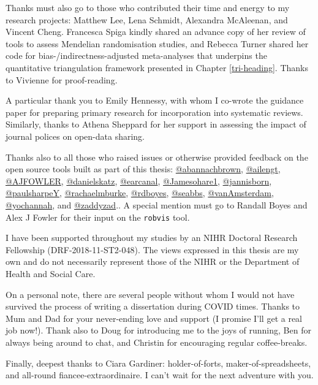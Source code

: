 \documentclass[a4paper, twoside]{templates/ociamthesis}
\begin{document}
\begin{romanpages}
\begin{acknowledgements}
  Thanks must also go to those who contributed their time and energy to my research projects: Matthew Lee, Lena Schmidt, Alexandra McAleenan, and Vincent Cheng. Francesca Spiga kindly shared an advance copy of her review of tools to assess Mendelian randomisation studies, and Rebecca Turner shared her code for bias-/indirectness-adjusted meta-analyses that underpins the quantitative triangulation framework presented in Chapter \ref{tri-heading}. Thanks to Vivienne for proof-reading.

  A particular thank you to Emily Hennessy, with whom I co-wrote the guidance paper for preparing primary research for incorporation into systematic reviews. Similarly, thanks to Athena Sheppard for her support in assessing the impact of journal polices on open-data sharing.

  Thanks also to all those who raised issues or otherwise provided feedback on the open source tools built as part of this thesis:
  \href{https://github.com/abannachbrown}{@abannachbrown}, \href{https://github.com/ailengt}{@ailengt}, \href{https://github.com/AJFOWLER}{@AJFOWLER}, \href{https://github.com/danielskatz}{@danielskatz}, \href{https://github.com/earcanal}{@earcanal}, \href{https://github.com/Jamesohare1}{@Jamesohare1}, \href{https://github.com/jannisborn}{@jannisborn}, \href{https://github.com/paulsharpeY}{@paulsharpeY}, \href{https://github.com/rachaelmburke}{@rachaelmburke}, \href{https://github.com/rdboyes}{@rdboyes}, \href{https://github.com/seabbs}{@seabbs}, \href{https://github.com/vanAmsterdam}{@vanAmsterdam}, \href{https://github.com/yochannah}{@yochannah}, and \href{https://github.com/zaddyzad}{@zaddyzad}.. A special mention must go to Randall Boyes and Alex J Fowler for their input on the \texttt{robvis} tool.

  I have been supported throughout my studies by an NIHR Doctoral Research Fellowship (DRF-2018-11-ST2-048). The views expressed in this thesis are my own and do not necessarily represent those of the NIHR or the Department of Health and Social Care.

  On a personal note, there are several people without whom I would not have survived the process of writing a dissertation during COVID times. Thanks to Mum and Dad for your never-ending love and support (I promise I'll get a real job now!). Thank also to Doug for introducing me to the joys of running, Ben for always being around to chat, and Christin for encouraging regular coffee-breaks.

  Finally, deepest thanks to Ciara Gardiner: holder-of-forts, maker-of-spreadsheets, and all-round fiancee-extraordinaire. I can't wait for the next adventure with you.


\end{acknowledgements}
\end{romanpages}
\end{document}
